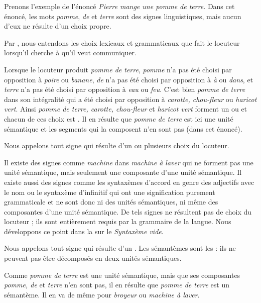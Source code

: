 Prenons l’exemple de l’énoncé \textit{Pierre mange une pomme de terre}. Dans cet énoncé, les mots \textit{pomme}, \textit{de} et \textit{terre} sont des signes linguistiques, mais aucun d’eux ne résulte d’un choix propre.\largerpage

{Par , nous entendons les choix lexicaux et grammaticaux que fait le locuteur lorsqu’il cherche à  qu’il veut communiquer.}

Lorsque le locuteur produit \textit{pomme de terre}, \textit{pomme} n’a pas été choisi par opposition à \textit{poire} ou \textit{banane}, \textit{de} n’a pas été choisi par opposition à \textit{à} ou \textit{dans}, et \textit{terre} n’a pas été choisi par opposition à \textit{eau} ou \textit{feu}. C’est bien \textit{pomme de terre} dans son intégralité qui a été choisi par opposition à \textit{carotte, chou-fleur} ou \textit{haricot vert}. Ainsi \textit{pomme de terre, carotte, chou-fleur} et \textit{haricot vert} forment un  ou  et chacun de ces choix est . Il en résulte que \textit{pomme de terre} est ici une unité sémantique et les segments qui la composent n’en sont pas (dans cet énoncé).

{Nous appelons  tout signe qui résulte d’un ou plusieurs choix du locuteur.}

Il existe des signes comme \textit{machine} dans \textit{machine à laver} qui ne forment pas une unité sémantique, mais seulement une composante d’une unité sémantique. Il existe aussi des signes comme les syntaxèmes d’accord en genre des adjectifs avec le nom ou le syntaxème d’infinitif qui ont une signification purement grammaticale et ne sont donc ni des unités sémantiques, ni même des composantes d’une unité sémantique. De tels signes ne résultent pas de choix du locuteur ; ils sont entièrement requis par la grammaire de la langue. Nous développons ce point dans la  sur le \textit{Syntaxème vide}.

{Nous appelons  tout signe qui résulte d’un . Les sémantèmes sont les  : ils ne peuvent pas être décomposés en deux unités sémantiques.}

Comme \textit{pomme de terre} est une unité sémantique, mais que ses composantes \textit{pomme, de} et \textit{terre} n’en sont pas, il en résulte que \textit{pomme de terre} est un sémantème. Il en va de même pour \textit{broyeur} ou \textit{machine à laver}.

